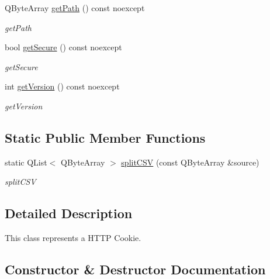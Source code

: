 \begin{DoxyCompactItemize}
\mbox{\label{class_http_cookie_aed5277e7667f8b38d1789bab44ee33fc}} 
Q\+Byte\+Array \hyperlink{class_http_cookie_aed5277e7667f8b38d1789bab44ee33fc}{get\+Path} () const noexcept
\begin{DoxyCompactList}\small\item\em get\+Path \end{DoxyCompactList}\item 
\mbox{\label{class_http_cookie_aba32d79bc73dda77b028f4355c4313ca}} 
bool \hyperlink{class_http_cookie_aba32d79bc73dda77b028f4355c4313ca}{get\+Secure} () const noexcept
\begin{DoxyCompactList}\small\item\em get\+Secure \end{DoxyCompactList}\item 
\mbox{\label{class_http_cookie_ad3c11641e67f8c051eecd5d34f2199fd}} 
int \hyperlink{class_http_cookie_ad3c11641e67f8c051eecd5d34f2199fd}{get\+Version} () const noexcept
\begin{DoxyCompactList}\small\item\em get\+Version \end{DoxyCompactList}\end{DoxyCompactItemize}
\subsection*{Static Public Member Functions}
\begin{DoxyCompactItemize}
\item 
static Q\+List$<$ Q\+Byte\+Array $>$ \hyperlink{class_http_cookie_a3f086e32413e23fdab53ffefa70b8b0e}{split\+C\+SV} (const Q\+Byte\+Array \&source)
\begin{DoxyCompactList}\small\item\em split\+C\+SV \end{DoxyCompactList}\end{DoxyCompactItemize}


\subsection{Detailed Description}
This class represents a H\+T\+TP Cookie. 

\subsection{Constructor \& Destructor Documentation}
\mbox{\label{class_http_cookie_aeb0f2cb5f7e8ef2fc7503663e29941c4}} 
